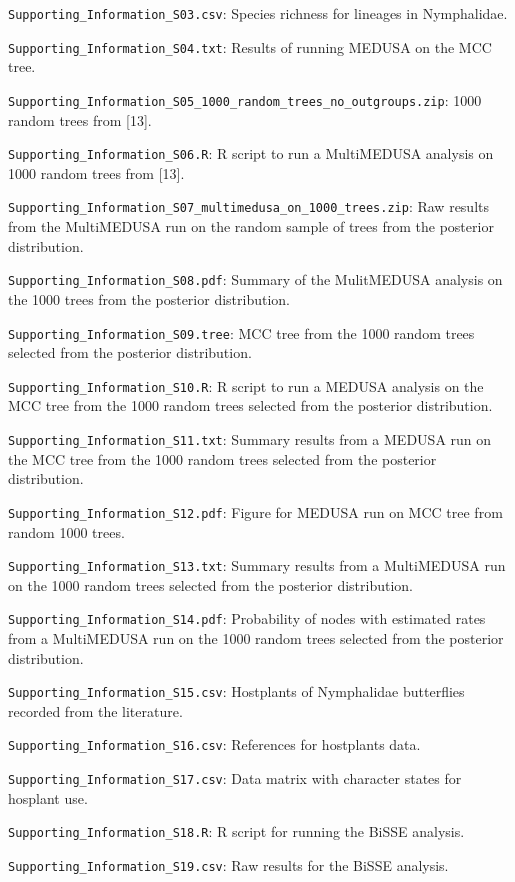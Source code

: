 \documentclass[10pt]{article}
\begin{document}
\texttt{Supporting\_Information\_S03.csv}: Species richness for lineages
in Nymphalidae.

\texttt{Supporting\_Information\_S04.txt}: Results of running MEDUSA on
the MCC tree.

\texttt{Supporting\_Information\_S05\_1000\_random\_trees\_no\_outgroups.zip}:
1000 random trees from {[}13{]}.

\texttt{Supporting\_Information\_S06.R}: R script to run a MultiMEDUSA
analysis on 1000 random trees from {[}13{]}.

\texttt{Supporting\_Information\_S07\_multimedusa\_on\_1000\_trees.zip}:
Raw results from the MultiMEDUSA run on the random sample of trees from
the posterior distribution.

\texttt{Supporting\_Information\_S08.pdf}: Summary of the MulitMEDUSA
analysis on the 1000 trees from the posterior distribution.

\texttt{Supporting\_Information\_S09.tree}: MCC tree from the 1000
random trees selected from the posterior distribution.

\texttt{Supporting\_Information\_S10.R}: R script to run a MEDUSA
analysis on the MCC tree from the 1000 random trees selected from the
posterior distribution.

\texttt{Supporting\_Information\_S11.txt}: Summary results from a MEDUSA
run on the MCC tree from the 1000 random trees selected from the
posterior distribution.

\texttt{Supporting\_Information\_S12.pdf}: Figure for MEDUSA run on MCC
tree from random 1000 trees.

\texttt{Supporting\_Information\_S13.txt}: Summary results from a
MultiMEDUSA run on the 1000 random trees selected from the posterior
distribution.

\texttt{Supporting\_Information\_S14.pdf}: Probability of nodes with
estimated rates from a MultiMEDUSA run on the 1000 random trees selected
from the posterior distribution.

\texttt{Supporting\_Information\_S15.csv}: Hostplants of Nymphalidae
butterflies recorded from the literature.

\texttt{Supporting\_Information\_S16.csv}: References for hostplants
data.

\texttt{Supporting\_Information\_S17.csv}: Data matrix with character
states for hosplant use.

\texttt{Supporting\_Information\_S18.R}: R script for running the BiSSE
analysis.

\texttt{Supporting\_Information\_S19.csv}: Raw results for the BiSSE
analysis.
\end{document}
